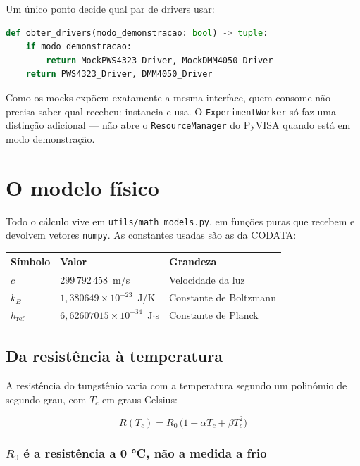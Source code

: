 \documentclass[11pt,a4paper]{article}
\newcommand{\arqv}[1]{\texttt{#1}}
\newcommand{\classe}[1]{\texttt{#1}}
\begin{document}
Um único ponto decide qual par de drivers usar:

\begin{lstlisting}[language=Python]
def obter_drivers(modo_demonstracao: bool) -> tuple:
    if modo_demonstracao:
        return MockPWS4323_Driver, MockDMM4050_Driver
    return PWS4323_Driver, DMM4050_Driver
\end{lstlisting}

Como os mocks expõem exatamente a mesma interface, quem consome não precisa
saber qual recebeu: instancia e usa. O \classe{ExperimentWorker} só faz uma
distinção adicional --- não abre o \classe{ResourceManager} do PyVISA quando
está em modo demonstração.

\section{O modelo físico}

Todo o cálculo vive em \arqv{utils/math\_models.py}, em funções puras que
recebem e devolvem vetores \texttt{numpy}. As constantes usadas são as da
CODATA:

\begin{center}
\begin{tabular}{@{}lll@{}}
\toprule
\textbf{Símbolo} & \textbf{Valor} & \textbf{Grandeza} \\
\midrule
$c$ & $299\,792\,458$~m/s & Velocidade da luz \\
$k_B$ & $1{,}380649 \times 10^{-23}$~J/K & Constante de Boltzmann \\
$h_{\text{ref}}$ & $6{,}62607015 \times 10^{-34}$~J$\cdot$s & Constante de Planck \\
\bottomrule
\end{tabular}
\end{center}

\subsection{Da resistência à temperatura}

A resistência do tungstênio varia com a temperatura segundo um polinômio de
segundo grau, com $T_c$ em graus Celsius:

\begin{equation}
R(T_c) = R_0\,\bigl(1 + \alpha T_c + \beta T_c^2\bigr)
\label{eq:rt}
\end{equation}

\subsubsection*{$R_0$ é a resistência a 0 °C, não a medida a frio}
\end{document}
